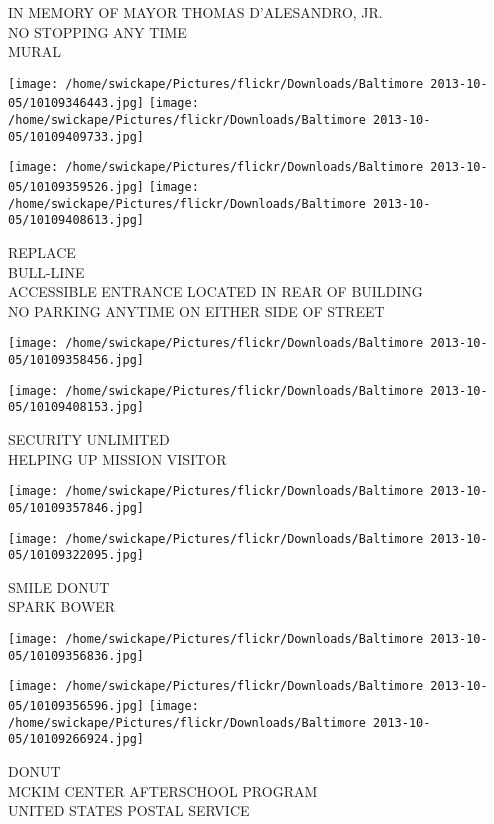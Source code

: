 \documentclass[10pt,letterpaper]{article}
\begin{document}
IN MEMORY OF MAYOR THOMAS D'ALESANDRO, JR.\\
NO STOPPING ANY TIME\\
MURAL
\pagebreak

\texttt{[image: /home/swickape/Pictures/flickr/Downloads/Baltimore 2013-10-05/10109346443.jpg]}
\texttt{[image: /home/swickape/Pictures/flickr/Downloads/Baltimore 2013-10-05/10109409733.jpg]}

\texttt{[image: /home/swickape/Pictures/flickr/Downloads/Baltimore 2013-10-05/10109359526.jpg]}
\texttt{[image: /home/swickape/Pictures/flickr/Downloads/Baltimore 2013-10-05/10109408613.jpg]}

REPLACE\\
BULL{-}LINE\\
ACCESSIBLE ENTRANCE LOCATED IN REAR OF BUILDING\\
NO PARKING ANYTIME ON EITHER SIDE OF STREET
\pagebreak

\texttt{[image: /home/swickape/Pictures/flickr/Downloads/Baltimore 2013-10-05/10109358456.jpg]}

\vspace{0.25in}
\texttt{[image: /home/swickape/Pictures/flickr/Downloads/Baltimore 2013-10-05/10109408153.jpg]}

SECURITY UNLIMITED\\
HELPING UP MISSION VISITOR
\pagebreak

\texttt{[image: /home/swickape/Pictures/flickr/Downloads/Baltimore 2013-10-05/10109357846.jpg]}

\vspace{0.25in}
\texttt{[image: /home/swickape/Pictures/flickr/Downloads/Baltimore 2013-10-05/10109322095.jpg]}

SMILE DONUT\\
SPARK BOWER
\pagebreak

\texttt{[image: /home/swickape/Pictures/flickr/Downloads/Baltimore 2013-10-05/10109356836.jpg]}

\vspace{0.25in}
\texttt{[image: /home/swickape/Pictures/flickr/Downloads/Baltimore 2013-10-05/10109356596.jpg]}
\texttt{[image: /home/swickape/Pictures/flickr/Downloads/Baltimore 2013-10-05/10109266924.jpg]}

DONUT\\
MCKIM CENTER AFTERSCHOOL PROGRAM\\
UNITED STATES POSTAL SERVICE
\pagebreak
\end{document}
